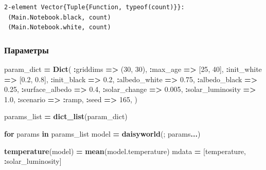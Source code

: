 \documentclass[
  english,
  russian,
  12pt,
  a4paper,
  DIV=11,
  numbers=noendperiod]{scrreprt}
\newenvironment{Shaded}{\begin{snugshade}}{\end{snugshade}}
\newcommand{\ControlFlowTok}[1]{\textcolor[rgb]{0.13,0.29,0.53}{\textbf{#1}}}
\newcommand{\FloatTok}[1]{\textcolor[rgb]{0.00,0.00,0.81}{#1}}
\newcommand{\FunctionTok}[1]{\textcolor[rgb]{0.13,0.29,0.53}{\textbf{#1}}}
\newcommand{\KeywordTok}[1]{\textcolor[rgb]{0.13,0.29,0.53}{\textbf{#1}}}
\newcommand{\NormalTok}[1]{#1}
\newcommand{\OperatorTok}[1]{\textcolor[rgb]{0.81,0.36,0.00}{\textbf{#1}}}
\begin{document}
\begin{verbatim}
2-element Vector{Tuple{Function, typeof(count)}}:
 (Main.Notebook.black, count)
 (Main.Notebook.white, count)
\end{verbatim}

\subsubsection{Параметры}\label{ux43fux430ux440ux430ux43cux435ux442ux440ux44b}

\begin{Shaded}
\begin{Highlighting}[]
\NormalTok{param\_dict }\OperatorTok{=} \FunctionTok{Dict}\NormalTok{(}
    \OperatorTok{:}\NormalTok{griddims }\OperatorTok{=\textgreater{}}\NormalTok{ (}\FloatTok{30}\NormalTok{, }\FloatTok{30}\NormalTok{),}
    \OperatorTok{:}\NormalTok{max\_age }\OperatorTok{=\textgreater{}}\NormalTok{ [}\FloatTok{25}\NormalTok{, }\FloatTok{40}\NormalTok{],}
    \OperatorTok{:}\NormalTok{init\_white }\OperatorTok{=\textgreater{}}\NormalTok{ [}\FloatTok{0.2}\NormalTok{, }\FloatTok{0.8}\NormalTok{],}
    \OperatorTok{:}\NormalTok{init\_black }\OperatorTok{=\textgreater{}} \FloatTok{0.2}\NormalTok{,}
    \OperatorTok{:}\NormalTok{albedo\_white }\OperatorTok{=\textgreater{}} \FloatTok{0.75}\NormalTok{,}
    \OperatorTok{:}\NormalTok{albedo\_black }\OperatorTok{=\textgreater{}} \FloatTok{0.25}\NormalTok{,}
    \OperatorTok{:}\NormalTok{surface\_albedo }\OperatorTok{=\textgreater{}} \FloatTok{0.4}\NormalTok{,}
    \OperatorTok{:}\NormalTok{solar\_change }\OperatorTok{=\textgreater{}} \FloatTok{0.005}\NormalTok{,}
    \OperatorTok{:}\NormalTok{solar\_luminosity }\OperatorTok{=\textgreater{}} \FloatTok{1.0}\NormalTok{,}
    \OperatorTok{:}\NormalTok{scenario }\OperatorTok{=\textgreater{}} \OperatorTok{:}\NormalTok{ramp,}
    \OperatorTok{:}\NormalTok{seed }\OperatorTok{=\textgreater{}} \FloatTok{165}\NormalTok{,}
\NormalTok{)}

\NormalTok{params\_list }\OperatorTok{=} \FunctionTok{dict\_list}\NormalTok{(param\_dict)}

\ControlFlowTok{for}\NormalTok{ params }\KeywordTok{in}\NormalTok{ params\_list}
\NormalTok{    model }\OperatorTok{=} \FunctionTok{daisyworld}\NormalTok{(; params}\OperatorTok{...}\NormalTok{)}

    \FunctionTok{temperature}\NormalTok{(model) }\OperatorTok{=} \FunctionTok{mean}\NormalTok{(model.temperature)}
\NormalTok{    mdata }\OperatorTok{=}\NormalTok{ [temperature, }\OperatorTok{:}\NormalTok{solar\_luminosity]}


\end{Highlighting}
\end{Shaded}
\end{document}
